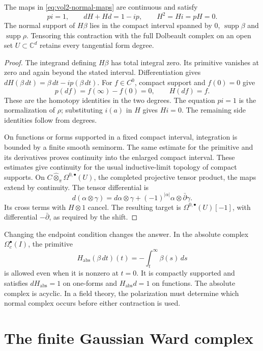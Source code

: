 \begin{proposition}\label{prop:vol2-normal-retract}
The maps in \eqref{eq:vol2-normal-maps} are continuous and satisfy
\[
 pi=1,\qquad dH+Hd=1-ip,\qquad
 H^2=Hi=pH=0.
\]
The normal support of $H\beta$ lies in the compact interval spanned
by $0$, $\operatorname{supp}\beta$ and $\operatorname{supp}\rho$.
Tensoring this contraction with the full Dolbeault complex on an
open set $U\subset\mathbb C^d$ retains every tangential form degree.
\end{proposition}
\begin{proof}
The integrand defining $H\beta$ has total integral zero. Its
primitive vanishes at zero and again beyond the stated interval.
Differentiation gives $dH(\beta\,dt)=\beta\,dt-ip(\beta\,dt)$.
For $f\in C^0$, compact support and $f(0)=0$ give
\[
 p(df)=f(\infty)-f(0)=0,\qquad H(df)=f.
\]
These are the homotopy identities in the two degrees. The equation
$pi=1$ is the normalization of $\rho$; substituting $i(a)$ in $H$
gives $Hi=0$. The remaining side identities follow from degrees.

On functions or forms supported in a fixed compact interval,
integration is bounded by a finite smooth seminorm. The same
estimate for the primitive and its derivatives proves continuity
into the enlarged compact interval. These estimates give
continuity for the usual inductive-limit topology of compact
supports. On
$C\widehat\otimes_\pi\Omega^{0,\bullet}(U)$, the completed
projective tensor product, the maps extend by continuity.
The tensor differential is
\[
 d(\alpha\otimes\gamma)
 =d\alpha\otimes\gamma+(-1)^{|\alpha|}
                         \alpha\otimes\bar\partial\gamma.
\]
Its cross terms with $H\otimes1$ cancel. The resulting target is
$\Omega^{0,\bullet}(U)[-1]$, with differential $-\bar\partial$,
as required by the shift.
\end{proof}

Changing the endpoint condition changes the answer. In the
absolute complex $\Omega_c^\bullet(I)$, the primitive
\[
 H_{\mathrm{abs}}(\beta\,dt)(t)
   =-\int_t^\infty\beta(s)\,ds
\]
is allowed even when it is nonzero at $t=0$. It is compactly
supported and satisfies $dH_{\mathrm{abs}}=1$ on one-forms and
$H_{\mathrm{abs}}d=1$ on functions. The absolute complex is
acyclic. In a field theory, the polarization must determine which
normal complex occurs before either contraction is used.

\section{The finite Gaussian Ward complex}
\label{sec:vol2-gaussian-ward}

